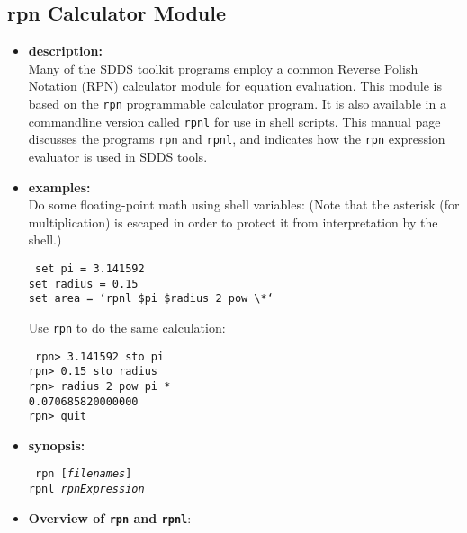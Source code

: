 \newpage
\subsection{rpn Calculator Module}
\label{rpn}
\label{rpn Calculator Module}

\begin{itemize}
\item {\bf description:} \hspace*{1mm}\\

Many of the SDDS toolkit programs employ a common Reverse Polish Notation (RPN) calculator module for equation evaluation.
This module is based on the {\tt rpn} programmable calculator program.  It is also available in a commandline
version called {\tt rpnl} for use in shell scripts.  This manual page discusses the programs {\tt rpn} and 
{\tt rpnl},  and indicates how the {\tt rpn} expression evaluator is used in SDDS tools.
\item {\bf examples:} \\
Do some floating-point math using shell variables:
(Note that the asterisk (for multiplication) is escaped in order to protect it from interpretation by the shell.)
\begin{flushleft}{\tt
set pi = 3.141592\\
set radius = 0.15\\
set area = `rpnl \$pi \$radius 2 pow \verb|\|*`\\
}\end{flushleft}
Use {\tt rpn} to do the same calculation:
\begin{flushleft}{\tt
rpn> 3.141592 sto pi\\
rpn> 0.15 sto radius\\
rpn> radius 2 pow pi *\\
	      0.070685820000000\\
rpn> quit\\
}\end{flushleft}
\item {\bf synopsis:}
\begin{flushleft}{\tt
rpn [{\em filenames}]\\
rpnl {\em rpnExpression}
}\end{flushleft}
\item {\bf Overview of {\tt rpn} and {\tt rpnl}}:


\end{itemize}
